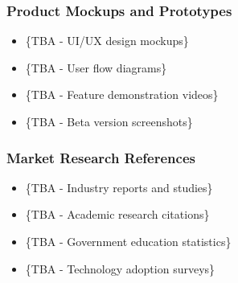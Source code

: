 \subsubsection{Product Mockups and Prototypes}
\begin{itemize}
    \item \{TBA - UI/UX design mockups\}
    \item \{TBA - User flow diagrams\}
    \item \{TBA - Feature demonstration videos\}
    \item \{TBA - Beta version screenshots\}
\end{itemize}

\subsubsection{Market Research References}
\begin{itemize}
    \item \{TBA - Industry reports and studies\}
    \item \{TBA - Academic research citations\}
    \item \{TBA - Government education statistics\}
    \item \{TBA - Technology adoption surveys\}
\end{itemize}